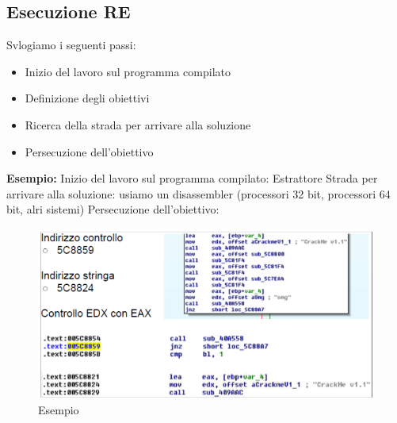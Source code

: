 \documentclass[8pt]{extarticle}
\begin{document}
\subsection{Esecuzione RE}
Svlogiamo i seguenti passi:
\begin{itemize}
    \item Inizio del lavoro sul programma compilato
    \item Definizione degli obiettivi
    \item Ricerca della strada per arrivare alla soluzione
    \item Persecuzione dell’obiettivo
\end{itemize}
\textbf{Esempio:} Inizio del lavoro sul programma compilato: Estrattore Strada per arrivare alla 
soluzione: usiamo un disassembler (processori 32 bit, processori 64 bit, alri sistemi) Persecuzione 
dell’obiettivo:
\begin{figure}[H]
    \center
    \includegraphics[scale=0.3]{images/RCE2.png}
    \caption{Esempio}\label{fig:1}
\end{figure}
\end{document}
